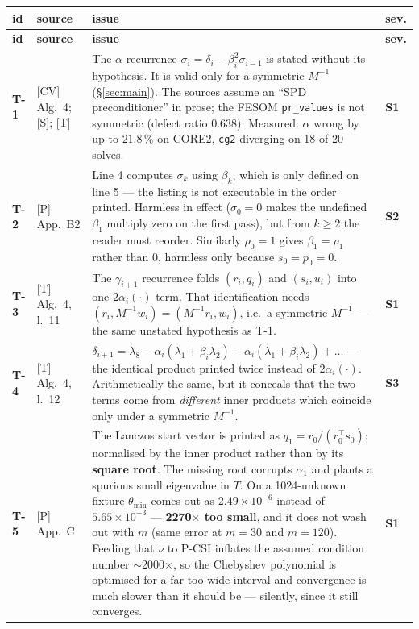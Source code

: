 \documentclass[11pt,a4paper]{article}
\newcommand{\Mi}{M^{-1}}
\newcommand{\sev}[1]{\textbf{#1}}
\newcommand{\src}[1]{\textsf{#1}}
\begin{document}
\begingroup
\small
\setlength{\tabcolsep}{4pt}
\begin{longtable}{@{}R{0.05\textwidth}R{0.13\textwidth}R{0.52\textwidth}R{0.07\textwidth}@{}}
\toprule
\textbf{id} & \textbf{source} & \textbf{issue} & \textbf{sev.}\\
\midrule
\endfirsthead
\toprule
\textbf{id} & \textbf{source} & \textbf{issue} & \textbf{sev.}\\
\midrule
\endhead
\bottomrule
\endfoot

\textbf{T-1} & \src{[CV]} Alg.~4; \src{[S]}; \src{[T]} &
The $\alpha$ recurrence $\sigma_i=\delta_i-\beta_i^2\sigma_{i-1}$ is stated without its
hypothesis. It is valid only for a symmetric $\Mi$ (\S\ref{sec:main}). The sources assume an
``SPD preconditioner'' in prose; the FESOM \texttt{pr\_values} is not symmetric (defect ratio
$0.638$). Measured: $\alpha$ wrong by up to $21.8\,\%$ on CORE2, \texttt{cg2} diverging on 18
of 20 solves. & \sev{S1}\\[2pt]

\textbf{T-2} & \src{[P]} App.~B2 &
Line 4 computes $\sigma_k$ using $\beta_k$, which is only defined on line 5 --- the listing is
not executable in the order printed. Harmless in effect ($\sigma_0=0$ makes the undefined
$\beta_1$ multiply zero on the first pass), but from $k\geq2$ the reader must reorder.
Similarly $\rho_0=1$ gives $\beta_1=\rho_1$ rather than $0$, harmless only because
$s_0=p_0=0$. & \sev{S2}\\[2pt]

\textbf{T-3} & \src{[T]} Alg.~4, l.~11 &
The $\gamma_{i+1}$ recurrence folds $(r_i,q_i)$ and $(s_i,u_i)$ into one $2\alpha_i(\cdot)$
term. That identification needs $(r_i,\Mi w_i)=(\Mi r_i,w_i)$, i.e.\ a symmetric $\Mi$ ---
the same unstated hypothesis as T-1. & \sev{S1}\\[2pt]

\textbf{T-4} & \src{[T]} Alg.~4, l.~12 &
$\delta_{i+1}=\lambda_8-\alpha_i(\lambda_1{+}\beta_i\lambda_2)-\alpha_i(\lambda_1{+}\beta_i\lambda_2)+\dots$
--- the identical product printed twice instead of $2\alpha_i(\cdot)$. Arithmetically the same,
but it conceals that the two terms come from \emph{different} inner products which coincide
only under a symmetric $\Mi$. & \sev{S3}\\[2pt]

\textbf{T-5} & \src{[P]} App.~C &
The Lanczos start vector is printed as $q_1=r_0/(r_0^{\top}s_0)$: normalised by the inner
product rather than by its \textbf{square root}. The missing root corrupts $\alpha_1$ and
plants a spurious small eigenvalue in $T$. On a 1024-unknown fixture $\theta_{\min}$ comes out
as $2.49\times10^{-6}$ instead of $5.65\times10^{-3}$ --- \textbf{2270$\times$ too small}, and
it does not wash out with $m$ (same error at $m=30$ and $m=120$). Feeding that $\nu$ to P-CSI
inflates the assumed condition number $\sim$2000$\times$, so the Chebyshev polynomial is
optimised for a far too wide interval and convergence is much slower than it should be ---
silently, since it still converges. & \sev{S1}\\[2pt]


\end{longtable}
\end{document}
